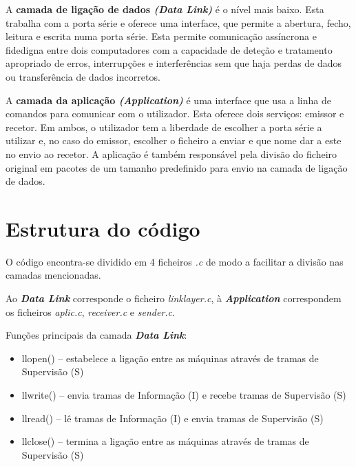 \documentclass[a4paper,11pt,portuguese]{article}
\begin{document}
    A \textbf{camada de ligação de dados \textit{(Data Link)}} é o nível mais baixo. Esta trabalha
    com a porta série e oferece uma interface, que permite a abertura, fecho, leitura e escrita
    numa porta série. Esta permite comunicação assíncrona e fidedigna entre dois
    computadores com a capacidade de deteção e tratamento apropriado de erros, interrupções 
    e interferências sem que haja perdas de dados ou transferência de dados incorretos. \par 

    A \textbf{camada da aplicação \textit{(Application)}} é uma interface que usa a linha de
    comandos para comunicar com o utilizador. Esta oferece dois serviços: emissor e recetor.
    Em ambos, o utilizador tem a liberdade de escolher a porta série a utilizar e, no caso do emissor, 
    escolher o ficheiro a enviar e que nome dar a este no envio ao recetor. A aplicação é também
    responsável pela divisão do ficheiro original em pacotes de um tamanho predefinido para
    envio na camada de ligação de dados. \par 


\section{Estrutura do código}

    O código encontra-se dividido em 4 ficheiros \textit{.c} de modo a facilitar a divisão
    nas camadas mencionadas. \par
    
    Ao \textbf{\textit{Data Link}} corresponde o ficheiro \textit{linklayer.c}, à
    \textbf{\textit{Application}} correspondem os ficheiros \textit{aplic.c},
    \textit{receiver.c} e \textit{sender.c}.
    
    \hfill \break
    \noindent Funções principais da camada \textbf{\textit{Data Link}}:
    \begin{itemize}
        \item llopen() -- estabelece a ligação entre as máquinas através de tramas de Supervisão (S)
        \item llwrite() -- envia tramas de Informação (I) e recebe tramas de Supervisão (S)
        \item llread() -- lê tramas de Informação (I) e envia tramas de Supervisão (S)
        \item llclose() -- termina a ligação entre as máquinas através de tramas de Supervisão (S)
    \end{itemize}
\end{document}
